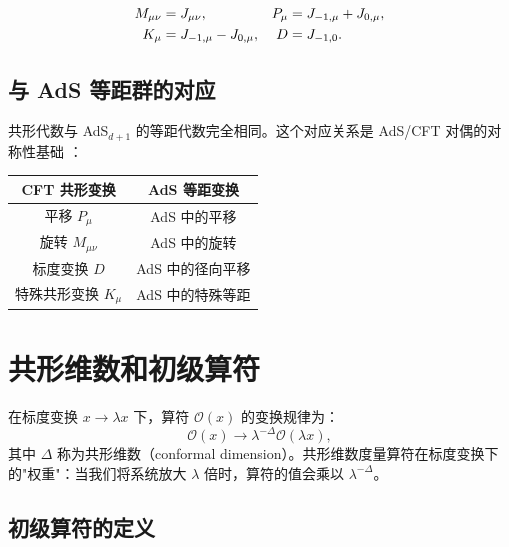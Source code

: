 \begin{property}[生成元的对应关系]
\begin{align}
    M_{\mu\nu} &= J_{\mu\nu}, & P_\mu &= J_{-1,\mu} + J_{0,\mu}, \notag \\
    K_\mu &= J_{-1,\mu} - J_{0,\mu}, & D &= J_{-1,0}.
\end{align}
\end{property}

\subsection{与 AdS 等距群的对应}

\begin{theorem}
共形代数与 AdS$_{d+1}$ 的等距代数完全相同。这个对应关系是 AdS/CFT 对偶的对称性基础 \cite{Maldacena1997}：
\begin{center}
\begin{tabular}{|c|c|}
\hline
\textbf{CFT 共形变换} & \textbf{AdS 等距变换} \\
\hline
平移 $P_\mu$ & AdS 中的平移 \\
旋转 $M_{\mu\nu}$ & AdS 中的旋转 \\
标度变换 $D$ & AdS 中的径向平移 \\
特殊共形变换 $K_\mu$ & AdS 中的特殊等距 \\
\hline
\end{tabular}
\end{center}
\end{theorem}

\section{共形维数和初级算符}

\begin{definition}[共形维数]
在标度变换 $x \to \lambda x$ 下，算符 $\mathcal{O}(x)$ 的变换规律为：
\begin{equation}
    \mathcal{O}(x) \to \lambda^{-\Delta} \mathcal{O}(\lambda x),
\end{equation}
其中 $\Delta$ 称为共形维数（conformal dimension）。共形维数度量算符在标度变换下的"权重"：当我们将系统放大 $\lambda$ 倍时，算符的值会乘以 $\lambda^{-\Delta}$。
\end{definition}

\subsection{初级算符的定义}

